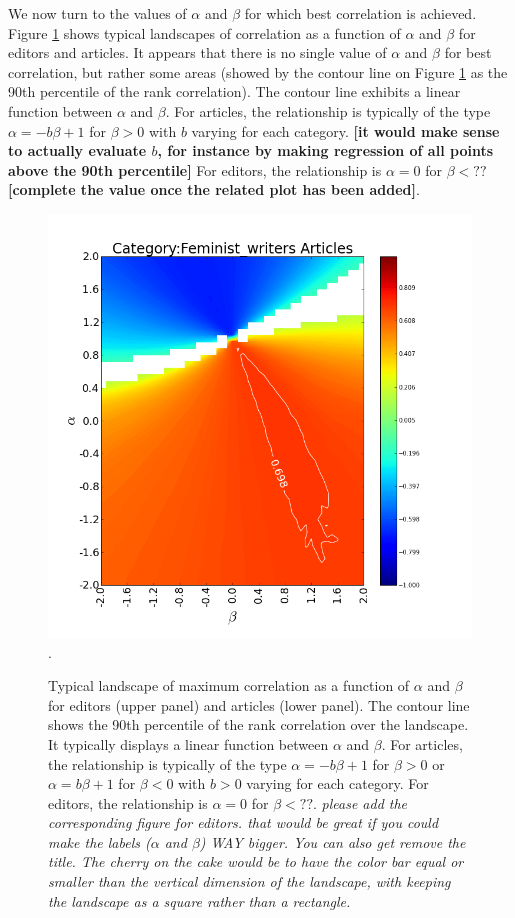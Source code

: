 We now turn to the values of $\alpha$ and $\beta$ for which best correlation is achieved.  Figure \ref{fig:landscape} shows typical landscapes of correlation as a function of $\alpha$ and $\beta$ for editors and articles. It appears that there is no single value of $\alpha$ and $\beta$ for best correlation, but rather some areas (showed by the contour line on Figure \ref{fig:landscape} as the 90th percentile of the rank correlation). The contour line exhibits a linear function between $\alpha$ and $\beta$. For articles, the relationship is typically of the type $\alpha = - b \beta + 1$ for $\beta >0$ with $b$ varying for each category. {\bf [it would make sense to actually evaluate $b$, for instance by making regression of all points above the 90th percentile]} For editors, the relationship is $\alpha = 0$ for $\beta < ??$ {\bf [complete the value once the related plot has been added]}. 

\begin{figure}[!t]
\centering
\includegraphics[width=0.9\columnwidth]{Figures/contour_fem.png}.
\caption{Typical landscape of maximum correlation as a function of $\alpha$ and $\beta$ for editors (upper panel) and articles (lower panel). The contour line shows the 90th percentile of the rank correlation over the landscape. It typically displays a linear function between $\alpha$ and $\beta$. For articles, the relationship is typically of the type $\alpha = - b \beta + 1$ for $\beta >0$ or $\alpha = b \beta + 1$ for $\beta < 0$ with $b>0$ varying for each category. For editors, the relationship is $\alpha = 0$ for $\beta < ??$. {\it please add the corresponding figure for editors.  that would be great if you could make the labels ($\alpha$ and $\beta$) WAY bigger. You can also get remove the title. The cherry on the cake would be to have the color bar equal or smaller than the vertical dimension of the landscape, with keeping the landscape as a square rather than a rectangle.}}
\label{fig:landscape}
\end{figure}


